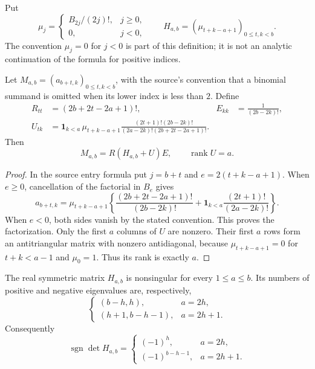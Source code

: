 Put
\[
 \mu_j=\begin{cases}B_{2j}/(2j)!,&j\geq0,\\0,&j<0,\end{cases}
 \qquad H_{a,b}=(\mu_{t+k-a+1})_{0\leq t,k<b}.
\]
The convention $\mu_j=0$ for $j<0$ is part of this definition; it is
not an analytic continuation of the formula for positive indices.

\begin{lemma}
\label{lem:general-even-factor}
Let $M_{a,b}=(a_{b+t,k})_{0\leq t,k<b}$, with the source's convention
that a binomial summand is omitted when its lower index is less than
$2$.  Define
\begin{align*}
 R_{tt}&=(2b+2t-2a+1)!,& E_{kk}&=\frac1{(2b-2k)!},\\
 U_{tk}&=\mathbf1_{k<a}\,\mu_{t+k-a+1}
 \frac{(2t+1)!(2b-2k)!}
 {(2a-2k)!(2b+2t-2a+1)!}.
\end{align*}
Then
\[
 M_{a,b}=R(H_{a,b}+U)E,
 \qquad \operatorname{rank}U=a.
\]
\end{lemma}

\begin{proof}
In the source entry formula put $j=b+t$ and
$e=2(t+k-a+1)$.  When $e\geq0$, cancellation of the factorial in
$B_e$ gives
\[
 a_{b+t,k}=\mu_{t+k-a+1}\left\{
 \frac{(2b+2t-2a+1)!}{(2b-2k)!}
 +\mathbf1_{k<a}\frac{(2t+1)!}{(2a-2k)!}\right\}.
\]
When $e<0$, both sides vanish by the stated convention.  This proves
the factorization.  Only the first $a$ columns of $U$ are nonzero.
Their first $a$ rows form an antitriangular matrix with nonzero
antidiagonal, because $\mu_{t+k-a+1}=0$ for $t+k<a-1$ and
$\mu_0=1$.  Thus its rank is exactly $a$.
\end{proof}

\begin{theorem}
\label{thm:shifted-H-inertia}
The real symmetric matrix $H_{a,b}$ is nonsingular for every
$1\leq a\leq b$.  Its numbers of positive and negative eigenvalues
are, respectively,
\[
 \begin{cases}
 (b-h,h),&a=2h,\\
 (h+1,b-h-1),&a=2h+1.
 \end{cases}
\]
Consequently
\[
 \operatorname{sgn}\det H_{a,b}=
 \begin{cases}(-1)^h,&a=2h,\\
 (-1)^{b-h-1},&a=2h+1.
 \end{cases}
\]
\end{theorem}

